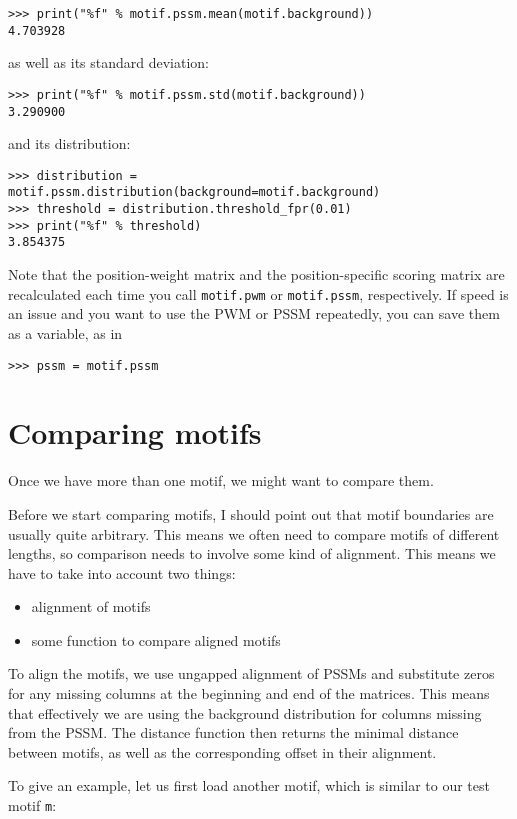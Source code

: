 \begin{verbatim}
>>> print("%f" % motif.pssm.mean(motif.background))
4.703928
\end{verbatim}
as well as its standard deviation:

\begin{verbatim}
>>> print("%f" % motif.pssm.std(motif.background))
3.290900
\end{verbatim}
and its distribution:

\begin{verbatim}
>>> distribution = motif.pssm.distribution(background=motif.background)
>>> threshold = distribution.threshold_fpr(0.01)
>>> print("%f" % threshold)
3.854375
\end{verbatim}

Note that the position-weight matrix and the position-specific scoring matrix are recalculated each time you call \verb+motif.pwm+ or \verb+motif.pssm+, respectively. If speed is an issue and you want to use the PWM or PSSM repeatedly, you can save them as a variable, as in
\begin{verbatim}
>>> pssm = motif.pssm
\end{verbatim}

\section{Comparing motifs}
\label{sec:comp}
Once we have more than one motif, we might want to compare them.

Before we start comparing motifs, I should point out that motif
boundaries are usually quite arbitrary. This means we often need
to compare motifs of different lengths, so comparison needs to involve
some kind of alignment.  This means we have to take into account two things:
\begin{itemize}
\item alignment of motifs
\item some function to compare aligned motifs
\end{itemize}
To align the motifs, we use ungapped alignment of PSSMs and substitute zeros
for any missing columns at the beginning and end of the matrices. This means
that effectively we are using the background distribution for columns missing
from the PSSM.
The distance function then returns the minimal distance between motifs, as
well as the corresponding offset in their alignment.

To give an example, let us first load another motif,
which is similar to our test motif \verb|m|:

